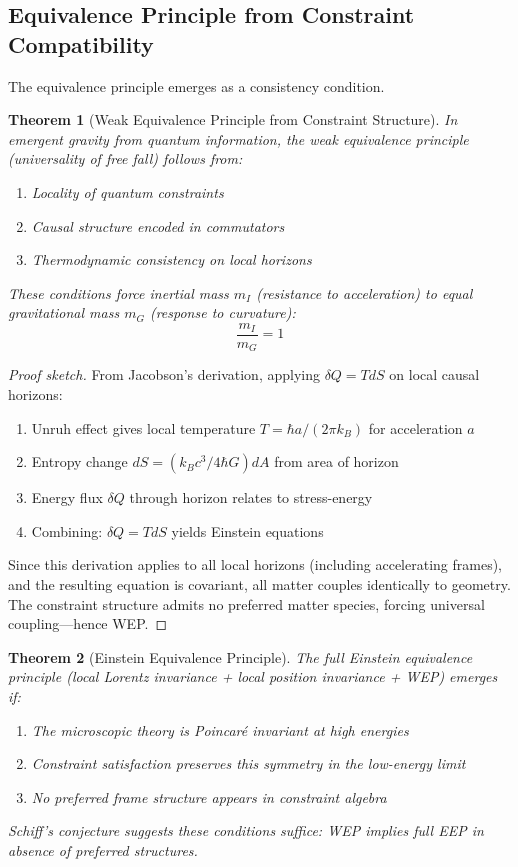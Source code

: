 \documentclass[11pt,a4paper]{article}
\newtheorem{theorem}{Theorem}[section]
\theoremstyle{remark}
\theoremstyle{definition}
\begin{document}
\subsection{Equivalence Principle from Constraint Compatibility}

The equivalence principle emerges as a consistency condition.

\begin{theorem}[Weak Equivalence Principle from Constraint Structure]
\label{thm:WEP}
In emergent gravity from quantum information, the weak equivalence principle (universality of free fall) follows from:
\begin{enumerate}[label=(\roman*)]
\item Locality of quantum constraints
\item Causal structure encoded in commutators
\item Thermodynamic consistency on local horizons
\end{enumerate}
These conditions force inertial mass $m_I$ (resistance to acceleration) to equal gravitational mass $m_G$ (response to curvature):
\begin{equation}
\frac{m_I}{m_G} = 1
\end{equation}
\end{theorem}

\begin{proof}[Proof sketch]
From Jacobson's derivation, applying $\delta Q = T dS$ on local causal horizons:
\begin{enumerate}
\item Unruh effect gives local temperature $T = \hbar a/(2\pi k_B)$ for acceleration $a$
\item Entropy change $dS = (k_B c^3 / 4\hbar G) dA$ from area of horizon
\item Energy flux $\delta Q$ through horizon relates to stress-energy
\item Combining: $\delta Q = T dS$ yields Einstein equations
\end{enumerate}
Since this derivation applies to all local horizons (including accelerating frames), and the resulting equation is covariant, all matter couples identically to geometry. The constraint structure admits no preferred matter species, forcing universal coupling—hence WEP.
\end{proof}

\begin{theorem}[Einstein Equivalence Principle]
The full Einstein equivalence principle (local Lorentz invariance + local position invariance + WEP) emerges if:
\begin{enumerate}[label=(\roman*)]
\item The microscopic theory is Poincaré invariant at high energies
\item Constraint satisfaction preserves this symmetry in the low-energy limit
\item No preferred frame structure appears in constraint algebra
\end{enumerate}
Schiff's conjecture suggests these conditions suffice: WEP implies full EEP in absence of preferred structures.
\end{theorem}
\end{document}
